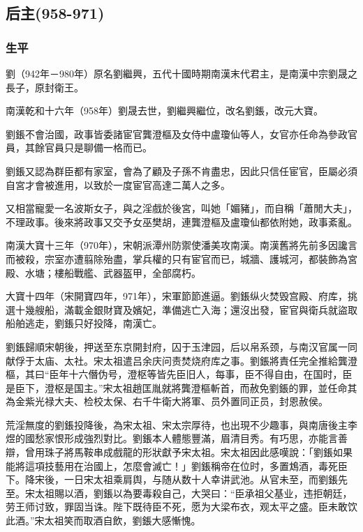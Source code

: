 
\subsection{后主\tiny(958-971)}

\subsubsection{生平}

劉（942年－980年）原名劉繼興，五代十國時期南漢末代君主，是南漢中宗劉晟之長子，原封衛王。

南漢乾和十六年（958年）劉晟去世，劉繼興繼位，改名劉鋹，改元大寶。

劉鋹不會治國，政事皆委諸宦官龔澄樞及女侍中盧瓊仙等人，女官亦任命為參政官員，其餘官員只是聊備一格而已。

劉鋹又認為群臣都有家室，會為了顧及子孫不肯盡忠，因此只信任宦官，臣屬必須自宮才會被進用，以致於一度宦官高達二萬人之多。

又相當寵愛一名波斯女子，與之淫戲於後宮，叫她「媚豬」，而自稱「蕭閒大夫」，不理政事。後來將政事又交予女巫樊胡，連龔澄樞及盧瓊仙都依附她，政事紊亂。

南漢大寶十三年（970年），宋朝派潭州防禦使潘美攻南漢。南漢舊將先前多因讒言而被殺，宗室亦遭翦除殆盡，掌兵權的只有宦官而已，城牆、護城河，都裝飾為宮殿、水塘；樓船戰艦、武器盔甲，全部腐朽。

大寶十四年（宋開寶四年，971年），宋軍節節進逼。劉鋹纵火焚毁宫殿、府库，挑選十幾艘船，滿載金銀財寶及嬪妃，準備逃亡入海；還沒出發，宦官與衛兵就盜取船舶逃走，劉鋹只好投降，南漢亡。

劉鋹歸順宋朝後，押送至东京開封府，囚于玉津园，后以帛系颈，与南汉官属一同献俘于太庙、太社。宋太祖遣吕余庆问责焚烧府库之事。劉鋹將責任完全推給龔澄樞，其曰“臣年十六僭伪号，澄枢等皆先臣旧人，每事，臣不得自由，在国时，臣是臣下，澄枢是国主。”宋太祖趙匡胤就將龔澄樞斬首，而赦免劉鋹的罪，並任命其為金紫光禄大夫、检校太保、右千牛衛大將軍、员外置同正员，封恩赦侯。

荒淫無度的劉鋹投降後，為宋太祖、宋太宗厚待，也出現不少趣事，與南唐後主李煜的國愁家恨形成強烈對比。劉鋹本人體態豐滿，眉清目秀。有巧思，亦能言善辯，曾用珠子將馬鞍串成戲龍的形狀獻予宋太祖。宋太祖因此感嘆說：「劉鋹如果能將這項技藝用在治國上，怎麼會滅亡！」劉鋹稱帝在位时，多置鴆酒，毒死臣下。降宋後，一日宋太祖乘肩舆，与随从数十人幸讲武池。从官未至，而劉鋹先至。宋太祖賜以酒，劉鋹以為要毒殺自己，大哭曰：“臣承祖父基业，违拒朝廷，劳王师讨致，罪固当诛。陛下既待臣不死，愿为大梁布衣，观太平之盛。臣未敢饮此酒。”宋太祖笑而取酒自飲，劉鋹大感慚愧。

